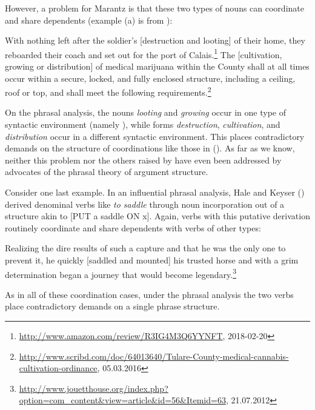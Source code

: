 However, a problem for Marantz is that these two types of nouns can coordinate and share dependents (example
(a) is from ): 

\eal
\ex With nothing left after the soldier's [destruction and looting] of their home, they reboarded
their coach and set out for the port of Calais.\footnote{%
  \url{http://www.amazon.com/review/R3IG4M3Q6YYNFT}, 2018-02-20}
\ex  The [cultivation, growing or distribution] of medical marijuana within the County shall at all
times occur within a secure, locked, and fully enclosed structure, including a ceiling, roof or top,
and shall meet the following
requirements.\footnote{%
\href{http://www.scribd.com/doc/64013640/Tulare-County-medical-cannabis-cultivation-ordinance}{http://www.scribd.com/doc/64013640/Tulare-County-medical-cannabis-cultivation-ordinance}, 05.03.2016}  
\zl

On the phrasal analysis, the nouns \emph{looting} and \emph{growing} occur in one type
of syntactic environment (namely \vP), while forms \emph{destruction}, \emph{cultivation}, 
 and \emph{distribution} occur in a different syntactic environment.  This places contradictory
demands on the structure of coordinations like those in ().  As far as we know, neither this problem nor
the others raised by \citet{Wechsler2008a} have even been addressed by advocates of the phrasal theory of
argument structure.    

Consider one last example.  In an influential phrasal analysis, Hale and Keyser (\citeyear{HK93a-u})
derived denominal verbs like \emph{to saddle} through noun incorporation out of a structure akin to
[PUT a saddle ON x].  Again, verbs with this putative derivation routinely coordinate and share
dependents with verbs of other types: 

\ea
Realizing the dire results of such a capture and that he was the only one to prevent it, he quickly
[saddled and mounted] his trusted horse and with a grim determination began a journey that would
become legendary.\footnote{%
  \url{http://www.jouetthouse.org/index.php?option=com_content&view=article&id=56&Itemid=63},
  21.07.2012}  
\z

\noindent
As in all of these \xnull coordination cases, under the phrasal analysis the two verbs place
contradictory demands on a single phrase structure.   

